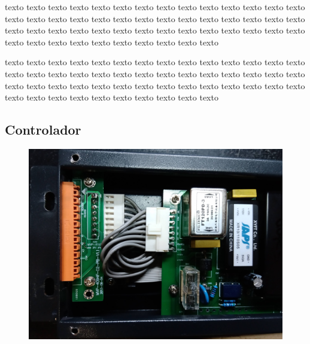 \documentclass[
11pt, %
]{charter}
\begin{document}
texto texto texto texto texto texto texto texto texto texto texto texto texto texto texto texto texto texto texto texto texto texto texto texto texto texto texto texto texto texto texto texto texto texto texto texto texto texto texto texto texto texto texto texto texto texto texto texto texto texto texto texto 

	

texto texto texto texto texto texto texto texto texto texto texto texto texto texto texto texto texto texto texto texto texto texto texto texto texto texto texto texto texto texto texto texto texto texto texto texto texto texto texto texto texto texto texto texto texto texto texto texto texto texto texto texto 

\pagebreak

\subsection{Controlador}

\begin{figure}[htpb]
\centering 
\includegraphics[width=1\textwidth]{./Pics/IMG_20210322_130602.jpg}
\caption{}
\label{fig:Placa de control ensamblada}
\end{figure}
\end{document}
